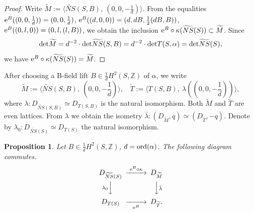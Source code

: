 \documentclass{article}
\theoremstyle{plain}
\newtheorem{proposition}[theorem]{Proposition}%
\theoremstyle{definition}
\theoremstyle{remark}
\newcommand{\Z}{{\mathbb Z}}
\begin{document}
\begin{proof}
Write 
$\widetilde{M} := \langle \widetilde{NS}(S, B), \: (0, 0, -\frac{1}{d}) \rangle $. 
From the equalities  
${\rm e\/}^{B}((0, 0, \frac{1}{d})) = (0, 0, \frac{1}{d})$, 
${\rm e\/}^{B}((d, 0, 0))           = (d, dB, \frac{1}{2}(dB, B))$, 
${\rm e\/}^{B}((0, l, 0))           = (0, l, (l, B))$, 
we obtain the inclusion
${\rm e\/}^{B} \circ \kappa (\widetilde{NS}(S)) \subset \widetilde{M}$. 
Since 
\begin{equation*}
{\rm det\/}\widetilde{M} 
= d^{-2}\cdot {\rm det\/}\widetilde{NS}(S, B) 
= d^{-2}\cdot {\rm det\/}T(S, \alpha ) 
= {\rm det\/}\widetilde{NS}(S), 
\end{equation*}
we have 
${\rm e\/}^{B} \circ \kappa (\widetilde{NS}(S)) = \widetilde{M}$.
\end{proof}  










After choosing 
a B-field lift 
$B \in \frac{1}{d}H^{2}(S, {\Z})$ 
of $\alpha $, 
we write 
\begin{equation*}
\widetilde{M} := \langle \widetilde{NS}(S, B), \: (0, 0, -\frac{1}{d}) \rangle  , \: \: \: \: 
\widetilde{T} := \langle T(S, B), \: \lambda ((0, 0, -\frac{1}{d})) \rangle ,  
\end{equation*}
where 
$\lambda : D_{\widetilde{NS}(S, B)} \simeq D_{T(S, B)}$ 
is the natural isomorphism. 
Both $\widetilde{M}$ and $\widetilde{T}$ 
are even lattices. 
From $\lambda $ 
we obtain the isometry 
$\bar{\lambda } : (D_{\widetilde{M}}, q) \simeq (D_{\widetilde{T}}, -q)$. 
Denote by 
$\lambda _{0} : D_{\widetilde{NS}(S)} \simeq D_{T(S)}$ 
the natural isomorphism. 







\begin{proposition}\label{commute}
Let $B \in \frac{1}{d}H^{2}(S, {\Z})$, $d= {\rm ord\/}(\alpha )$.  
The following diagram commutes. 
$$\CD
D_{\widetilde{NS}(S)} @>{\rm e\/}^{B} \circ \kappa >> D_{\widetilde{M}} \\
@V\lambda _{0}VV   @VV\bar{\lambda} V \\
D_{T(S)} @>>{\rm e\/}^{B}> D_{\widetilde{T}}.
\endCD $$
\end{proposition}
\end{document}

